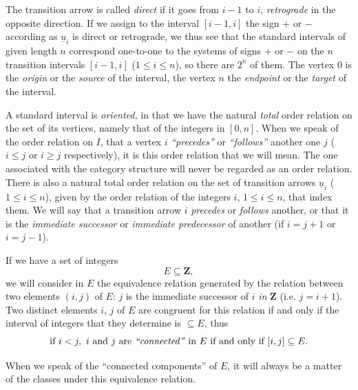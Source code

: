 The transition arrow is called \textit{direct} if it goes from $i-1$ to $i$, \textit{retrograde} in the opposite direction. If we assign to the interval $[i-1,i]$ the sign $+$ or $-$ according as $\underline{u}_i$ is direct or retrograde, we thus see that the
standard intervals of given length $n$ correspond one-to-one to the systems of signs $+$ or $-$ on the $n$ transition intervals $[i-1,i]$ ($1\leq i\leq n$), so there are $2^n$ of them. The vertex $0$ is the \textit{origin} or the \textit{source} of the interval, the vertex $n$ the \textit{endpoint} or the \textit{target} of the interval.

A standard interval is \textit{oriented,} in that we have the natural \textit{total} order relation on the set of its vertices, namely that of the integers in $[0,n]$. When we speak of the order relation on $I$, that a vertex $i$ \textit{``precedes''} or \textit{``follows''} another one $j$ ($i\leq j$ or $i\geq j$ respectively), it is this order relation that we will mean. The one associated with the category structure will never be regarded as an order relation. There is also a natural total order relation on the set of transition arrows $\underline{u}_i$ ($1\leq i\leq n$), given by the order relation of the integers $i$, $1\leq i\leq n$, that index them. We will say that a transition arrow $i$ \textit{precedes} or \textit{follows} another, or that it is the \textit{immediate successor} or \textit{immediate predecessor} of another (if $i=j+1$ or $i=j-1$). %


If we have a set of integers
\[
E\subseteq\mathbf{Z},
\]
we will consider in $E$ the equivalence relation generated by the relation between two elements $(i,j)$ of $E$: $j$ is the immediate successor of $i$ \textit{in} $\mathbf{Z}$ (i.e. $j=i+1$). Two distinct elements $i$, $j$ of $E$ are congruent for this relation if and only if the interval of integers that they determine is $\subseteq E$, thus %
\[
\text{if } i<j,\ i \text{ and } j \text{ are \textit{``connected''} in } E \text{ if and only if } [i,j]\subseteq E.
\]

When we speak of the ``connected components'' of $E$, it will always be a matter of the classes under this equivalence relation.

